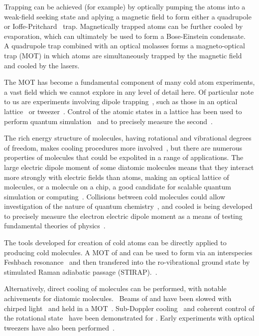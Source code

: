 Trapping can be achieved (for example) by optically pumping the atoms into a
weak-field seeking state and aplying a magnetic field to form either a
quadrupole~\cite{PhysRevLett.54.2596} or
Ioffe-Pritchard~\cite{PhysRevLett.51.1336} trap. Magnetically trapped atoms can
be further cooled by evaporation, which can ultimately be used to form a
Bose-Einstein condensate.~\cite{Anderson198} A quadrupole trap combined with an
optical molasses forms a magneto-optical trap (MOT) in which atoms are
simultaneously trapped by the magnetic field and cooled by the
lasers.~\cite{PhysRevLett.59.2631}

The MOT has become a fundamental component of many cold atom experiments, a vast
field which we cannot explore in any level of detail here. Of particular note to
us are experiments involving dipole trapping~\cite{PhysRevA.47.R4567}, such as
those in an optical lattice~\cite{Bakr2009} or tweezer~\cite{Ashkin:86}. Control
of the atomic states in a lattice has been used to perform quantum
simulation~\cite{Gross995} and to precisely measure the
second~\cite{Campbell90}.

The rich energy structure of molecules, having rotational and vibrational
degrees of freedom, makes cooling procedures more involved~\cite{Tarbutt2018},
but there are numerous properties of molecules that could be expolited in a
range of applications. The large electric dipole moment of some diatomic
molecules means that they interact more strongly with electric fields than
atoms, making an optical lattice of molecules, or a molecule on a chip, a good
candidate for scalable quantum simulation or computing~\cite{Micheli2006,
Andre2006}. Collisions between cold molecules could allow investigation of the
nature of quantum chemistry~\cite{Krems2008}, and cooled  is being
developed to precisely measure the electron electric dipole moment as a means of
testing fundamental theories of physics~\cite{Lim2018}.

The tools developed for creation of cold atoms can be
directly applied to producing cold molecules. A MOT of  and
 can be used to form  via an interspecies Feshbach
resonance~\cite{PhysRevA.85.032506, PhysRevA.89.033604} and then transfered into
the ro-vibrational ground state by stimulated Raman adiabatic passage
(STIRAP).~\cite{PhysRevLett.113.255301, RevModPhys.70.1003}.

Alternatively, direct cooling of molecules can be performed, with notable
achivements for diatomic molecules.~\cite{Shuman2010} Beams of  and
 have been slowed with chirped light~\cite{PhysRevLett.108.103002,
Truppe2017a} and held in a MOT~\cite{Barry2014, Williams2017}. Sub-Doppler
cooling~\cite{Truppe2017} and coherent control of the rotational
state~\cite{PhysRevLett.120.163201,Blackmore_2018} have been demonstrated for
. Early experiments with optical tweezers have also been
performed~\cite{Anderegg2019}.

